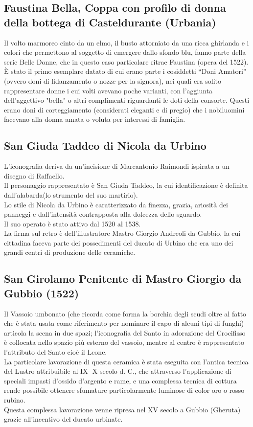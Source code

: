 \documentclass[hidelinks,12pt,a4paper]{article}
\begin{document}
\begin{flushleft}
		\subsection{Faustina Bella, Coppa con profilo di donna della bottega di Casteldurante (Urbania)}
		Il volto marmoreo cinto da un elmo, il busto attorniato da una ricca ghirlanda e i colori che permettono al soggetto di emergere dallo sfondo blu, fanno parte della serie Belle Donne, che in questo caso particolare ritrae Faustina (opera del 1522).\\
		È stato il primo esemplare datato di cui erano parte i cosiddetti “Doni Amatori” (ovvero doni di fidanzamento o nozze per la signora), nei quali era solito rappresentare donne i cui volti avevano poche varianti, con l'aggiunta dell'aggettivo "bella" o altri complimenti riguardanti le doti della consorte. Questi erano doni di corteggiamento (considerati eleganti e di pregio) che i nobiluomini facevano alla donna amata o voluta per interessi di famiglia.
		
		\subsection{San Giuda Taddeo di Nicola da Urbino}
		L'iconografia deriva da un’incisione di Marcantonio Raimondi ispirata a un disegno di Raffaello.\\
		Il personaggio rappresentato è San Giuda Taddeo, la cui identificazione è definita dall'alabarda(lo strumento del suo martirio).\\
		Lo stile di Nicola da Urbino è caratterizzato da finezza, grazia, ariosità dei panneggi e dall'intensità contrapposta alla dolcezza dello sguardo.\\
		Il suo operato è stato attivo dal 1520 al 1538.\\
		La firma sul retro è dell'illustratore Mastro Giorgio Andreoli da Gubbio, la cui cittadina faceva parte dei possedimenti del ducato di Urbino che era uno dei grandi centri di produzione delle ceramiche.
		
		\subsection{San Girolamo Penitente di Mastro Giorgio da Gubbio (1522)}
		Il Vassoio umbonato (che ricorda come forma la borchia degli scudi oltre al fatto che è stata usata come riferimento per nominare il capo di alcuni tipi di funghi) articola la scena in due spazi; l’iconografia del Santo in adorazione del Crocifisso è collocata nello spazio più esterno del vassoio, mentre al centro è rappresentato l’attributo del Santo cioè il Leone. \\
		La particolare lavorazione di questa ceramica è stata eseguita con l’antica tecnica del Lustro attribuibile al IX- X secolo d. C., che attraverso l’applicazione di speciali impasti d'ossido d'argento e rame, e una complessa tecnica di cottura rende possibile ottenere sfumature particolarmente luminose di color oro o rosso rubino.\\
		Questa complessa lavorazione venne ripresa nel XV secolo a Gubbio (Gheruta) grazie all'incentivo del ducato urbinate.
		

\end{flushleft}
\end{document}
